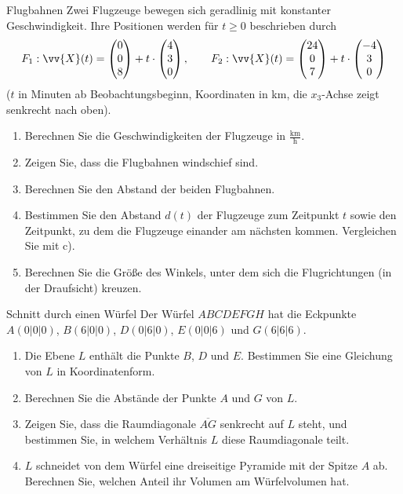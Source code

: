 \begin{uebung}{Flugbahnen}
Zwei Flugzeuge bewegen sich geradlinig mit konstanter Geschwindigkeit. Ihre Positionen werden für $t\geq 0$ beschrieben durch
\[F_1: \vv{X}(t) = \begin{pmatrix} 0\\ 0\\ 8\end{pmatrix}+t\cdot\begin{pmatrix} 4\\ 3\\ 0\end{pmatrix},\qquad F_2: \vv{X}(t) = \begin{pmatrix} 24\\ 0\\ 7\end{pmatrix}+t\cdot\begin{pmatrix} -4\\ 3\\ 0\end{pmatrix}\]
($t$ in Minuten ab Beobachtungsbeginn, Koordinaten in km, die $x_3$-Achse zeigt senkrecht nach oben).
\begin{enumerate}[label=\alph*)]
  \item Berechnen Sie die Geschwindigkeiten der Flugzeuge in $\frac{\text{km}}{\text{h}}$.
  \item Zeigen Sie, dass die Flugbahnen windschief sind.
  \item Berechnen Sie den Abstand der beiden Flugbahnen.
  \item Bestimmen Sie den Abstand $d(t)$ der Flugzeuge zum Zeitpunkt $t$ sowie den Zeitpunkt, zu dem die Flugzeuge einander am nächsten kommen. Vergleichen Sie mit c).
  \item Berechnen Sie die Größe des Winkels, unter dem sich die Flugrichtungen (in der Draufsicht) kreuzen.
\end{enumerate}
\end{uebung}

\begin{uebung}{Schnitt durch einen Würfel}
Der Würfel $ABCDEFGH$ hat die Eckpunkte $A(0|0|0)$, $B(6|0|0)$, $D(0|6|0)$, $E(0|0|6)$ und $G(6|6|6)$.
\begin{enumerate}[label=\alph*)]
  \item Die Ebene $L$ enthält die Punkte $B$, $D$ und $E$. Bestimmen Sie eine Gleichung von $L$ in Koordinatenform.
  \item Berechnen Sie die Abstände der Punkte $A$ und $G$ von $L$.
  \item Zeigen Sie, dass die Raumdiagonale $\overline{AG}$ senkrecht auf $L$ steht, und bestimmen Sie, in welchem Verhältnis $L$ diese Raumdiagonale teilt.
  \item $L$ schneidet von dem Würfel eine dreiseitige Pyramide mit der Spitze $A$ ab. Berechnen Sie, welchen Anteil ihr Volumen am Würfelvolumen hat.
\end{enumerate}
\end{uebung}


